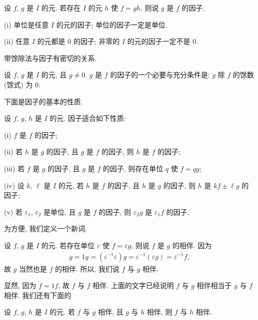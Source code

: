 \begin{definition}
    设 $f$, $g$ 是 $I$ 的元. 若存在 $I$ 的元 $h$ 使 $f=gh$, 则说 $g$ 是 $f$ 的因子.
\end{definition}

\begin{proposition}
    (i) 单位是任意 $I$ 的元的因子; 单位的因子一定是单位.

    (ii) 任意 $I$ 的元都是 $0$ 的因子; 非零的 $I$ 的元的因子一定不是 $0$.
\end{proposition}

带馀除法与因子有密切的关系.

\begin{proposition}
    设 $f$, $g$ 是 $I$ 的元, 且 $g \neq 0$. $g$ 是 $f$ 的因子的一个必要与充分条件是: $g$ 除 $f$ 的馀数 (馀式) 为 $0$.
\end{proposition}

下面是因子的基本的性质.

\begin{proposition}
    设 $f$, $g$, $h$ 是 $I$ 的元. 因子适合如下性质:

    (i) $f$ 是 $f$ 的因子;

    (ii) 若 $h$ 是 $g$ 的因子, 且 $g$ 是 $f$ 的因子, 则 $h$ 是 $f$ 的因子;

    (iii) 若 $f$ 是 $g$ 的因子, 且 $g$ 是 $f$ 的因子, 则存在单位 $q$ 使 $f = qg$;

    (iv) 设 $k$, $\ell$ 是 $I$ 的元. 若 $h$ 是 $f$ 的因子, 且 $h$ 是 $g$ 的因子, 则 $h$ 是 $kf \pm \ell g$ 的因子;

    (v) 若 $\varepsilon_1$, $\varepsilon_2$ 是单位, 且 $g$ 是 $f$ 的因子, 则 $\varepsilon_2 g$ 是 $\varepsilon_1 f$ 的因子.
\end{proposition}

为方便, 我们定义一个新词.

\begin{definition}
    设 $f$, $g$ 是 $I$ 的元. 若存在单位 $\varepsilon$ 使 $f = \varepsilon g$, 则说 $f$ 是 $g$ 的相伴. 因为
    \begin{align*}
        g = 1g = (\varepsilon^{-1} \varepsilon) g = \varepsilon^{-1} (\varepsilon g) = \varepsilon^{-1} f,
    \end{align*}
    故 $g$ 当然也是 $f$ 的相伴. 所以, 我们说 $f$ 与 $g$ 相伴.
\end{definition}

显然, 因为 $f = 1f$, 故 $f$ 与 $f$ 相伴. 上面的文字已经说明 $f$ 与 $g$ 相伴相当于 $g$ 与 $f$ 相伴. 我们还有下面的
\begin{proposition}
    设 $f$, $g$, $h$ 是 $I$ 的元. 若 $f$ 与 $g$ 相伴, 且 $g$ 与 $h$ 相伴, 则 $f$ 与 $h$ 相伴.
\end{proposition}

